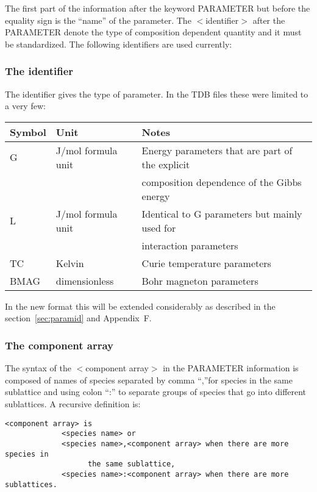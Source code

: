 \documentclass[12pt]{article}
\begin{document}
The first part of the information after the keyword PARAMETER but
before the equality sign is the ``name'' of the parameter.  The
$<$identifier$>$ after the PARAMETER denote the type of composition
dependent quantity and it must be standardized.  The following
identifiers are used currently:

\subsubsection{The identifier}\label{sec:tdbid}

The identifier gives the type of parameter.  In the TDB files these
were limited to a very few:

\begin{tabular}{lll}
Symbol & Unit &      Notes\\\hline
G      & J/mol formula unit & Energy parameters that are part of the explicit\\
 && composition dependence of the Gibbs energy\\
L     & J/mol formula unit & Identical to G parameters but mainly used for\\
 && interaction parameters\\
TC    & Kelvin & Curie temperature parameters\\
BMAG & dimensionless & Bohr magneton parameters\\\hline
\end{tabular}

\bigskip

In the new format this will be extended considerably as described
in the section~\ref{sec:paramid} and Appendix~F.

\subsubsection{The component array}\label{sec:comparr}

The syntax of the $<$component array$>$ in the PARAMETER information is
composed of names of species separated by comma ``,''for species in the
same sublattice and using colon ``:'' to separate groups of species that
go into different sublattices.  A recursive definition is:

\begin{verbatim}
<component array> is
             <species name> or
             <species name>,<component array> when there are more species in
                   the same sublattice,
             <species name>:<component array> when there are more sublattices.
\end{verbatim}
\end{document}
